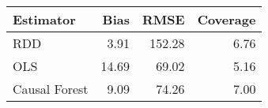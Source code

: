 \begin{table}[ht]
\centering
\begin{tabular}{lrrr}
  \hline
Estimator & Bias & RMSE & Coverage \\ 
  \hline
RDD & 3.91 & 152.28 & 6.76 \\ 
  OLS & 14.69 & 69.02 & 5.16 \\ 
  Causal Forest & 9.09 & 74.26 & 7.00 \\ 
   \hline
\end{tabular}
\caption{} 
\end{table}
